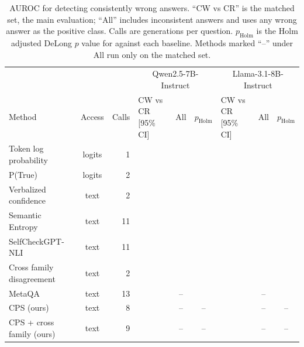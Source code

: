 \begin{table}[t]
\centering
\footnotesize
\caption{AUROC for detecting consistently wrong answers. ``CW vs CR'' is the matched set, the main evaluation; ``All'' includes inconsistent answers and uses any wrong answer as the positive class. Calls are generations per question. $p_{\mathrm{Holm}}$ is the Holm adjusted DeLong $p$ value for \cps{} against each baseline. Methods marked ``--'' under All run only on the matched set.}
\label{tab:main}
\begin{tabular}{lcrlcclcc}
\toprule
 & & & \multicolumn{3}{c}{Qwen2.5-7B-Instruct} & \multicolumn{3}{c}{Llama-3.1-8B-Instruct} \\
Method & Access & Calls & CW vs CR [95\% CI] & All & $p_{\mathrm{Holm}}$ & CW vs CR [95\% CI] & All & $p_{\mathrm{Holm}}$ \\
\midrule
Token log probability & logits & 1 & \TODO{} & \TODO{} & \TODO{} & \TODO{} & \TODO{} & \TODO{} \\
P(True) & logits & 2 & \TODO{} & \TODO{} & \TODO{} & \TODO{} & \TODO{} & \TODO{} \\
Verbalized confidence & text & 2 & \TODO{} & \TODO{} & \TODO{} & \TODO{} & \TODO{} & \TODO{} \\
Semantic Entropy & text & 11 & \TODO{} & \TODO{} & \TODO{} & \TODO{} & \TODO{} & \TODO{} \\
SelfCheckGPT-NLI & text & 11 & \TODO{} & \TODO{} & \TODO{} & \TODO{} & \TODO{} & \TODO{} \\
Cross family disagreement & text & 2 & \TODO{} & \TODO{} & \TODO{} & \TODO{} & \TODO{} & \TODO{} \\
MetaQA & text & 13 & \TODO{} & -- & \TODO{} & \TODO{} & -- & \TODO{} \\
\midrule
CPS (ours) & text & 8 & \TODO{} & -- & -- & \TODO{} & -- & -- \\
\midrule
CPS + cross family (ours) & text & 9 & \TODO{} & -- & -- & \TODO{} & -- & -- \\
\bottomrule
\end{tabular}
\end{table}
